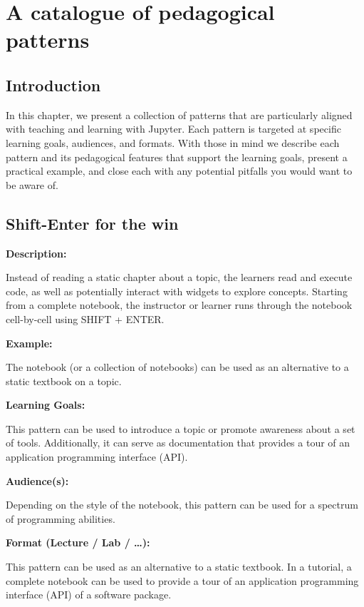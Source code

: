 \documentclass[]{book}
\begin{document}
\chapter{A catalogue of pedagogical patterns}\label{catalogue}

\section{Introduction}\label{introduction-2}

In this chapter, we present a collection of patterns that are
particularly aligned with teaching and learning with Jupyter. Each
pattern is targeted at specific learning goals, audiences, and formats.
With those in mind we describe each pattern and its pedagogical features
that support the learning goals, present a practical example, and close
each with any potential pitfalls you would want to be aware of.

\section{Shift-Enter for the win}\label{shift-enter-for-the-win}

\textbf{Description:}

Instead of reading a static chapter about a topic, the learners read and
execute code, as well as potentially interact with widgets to explore
concepts. Starting from a complete notebook, the instructor or learner
runs through the notebook cell-by-cell using SHIFT + ENTER.

\textbf{Example:}

The notebook (or a collection of notebooks) can be used as an
alternative to a static textbook on a topic.

\textbf{Learning Goals:}

This pattern can be used to introduce a topic or promote awareness about
a set of tools. Additionally, it can serve as documentation that
provides a tour of an application programming interface (API).

\textbf{Audience(s):}

Depending on the style of the notebook, this pattern can be used for a
spectrum of programming abilities.

\textbf{Format (Lecture / Lab / \ldots{}):}

This pattern can be used as an alternative to a static textbook. In a
tutorial, a complete notebook can be used to provide a tour of an
application programming interface (API) of a software package.
\end{document}
